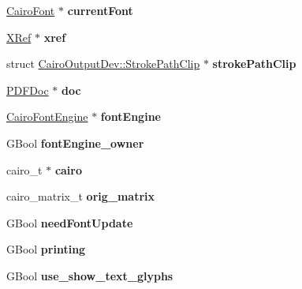 \begin{DoxyCompactItemize}
\hyperlink{class_cairo_font}{Cairo\+Font} $\ast$ {\bfseries current\+Font}
\item 
\mbox{\label{class_cairo_output_dev_a20b3ef367474baac0832e84fb490c4da}} 
\hyperlink{class_x_ref}{X\+Ref} $\ast$ {\bfseries xref}
\item 
\mbox{\label{class_cairo_output_dev_a42baa5b8dec299eb5a85f1168d6cb486}} 
struct \hyperlink{struct_cairo_output_dev_1_1_stroke_path_clip}{Cairo\+Output\+Dev\+::\+Stroke\+Path\+Clip} $\ast$ {\bfseries stroke\+Path\+Clip}
\item 
\mbox{\label{class_cairo_output_dev_a72901d5a9510ac22defa6d09190552be}} 
\hyperlink{class_p_d_f_doc}{P\+D\+F\+Doc} $\ast$ {\bfseries doc}
\item 
\mbox{\label{class_cairo_output_dev_a98c3bf4454b169ccba69addda510a0c8}} 
\hyperlink{class_cairo_font_engine}{Cairo\+Font\+Engine} $\ast$ {\bfseries font\+Engine}
\item 
\mbox{\label{class_cairo_output_dev_a73bd6550477c761470c1dc4e87b87cb5}} 
G\+Bool {\bfseries font\+Engine\+\_\+owner}
\item 
\mbox{\label{class_cairo_output_dev_a4df47c9d086540d41c00848756a6ff10}} 
cairo\+\_\+t $\ast$ {\bfseries cairo}
\item 
\mbox{\label{class_cairo_output_dev_a5297eb6c00c5017d05b1640dd3e5d924}} 
cairo\+\_\+matrix\+\_\+t {\bfseries orig\+\_\+matrix}
\item 
\mbox{\label{class_cairo_output_dev_ad6fb5a1b8b866cff117beab720821c94}} 
G\+Bool {\bfseries need\+Font\+Update}
\item 
\mbox{\label{class_cairo_output_dev_a57ec2906eac6f461d66bc518c18e77e7}} 
G\+Bool {\bfseries printing}
\item 
\mbox{\label{class_cairo_output_dev_a17f044236fc8f159e6e9d39b2b620612}} 
G\+Bool {\bfseries use\+\_\+show\+\_\+text\+\_\+glyphs}
\item 

\end{DoxyCompactItemize}
